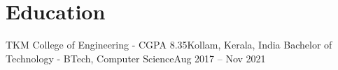 \section{Education}
  \resumeSubHeadingListStart
    \resumeHeading
      {TKM College of Engineering - CGPA 8.35}{Kollam, Kerala, India}
      {Bachelor of Technology - BTech, Computer Science}{Aug 2017 -- Nov 2021}
  \resumeSubHeadingListEnd
